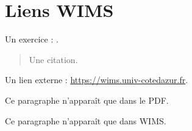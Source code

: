\documentclass[11pt]{article}
\theoremstyle{plain}
\theoremstyle{definition}
\begin{document}
\section{Liens WIMS}
\begin{center}
Un exercice : .
\end{center}
\begin{quote}
Une citation.
\end{quote}
Un lien externe : \url{https://wims.univ-cotedazur.fr}.
\begin{latexonly}
Ce paragraphe n'apparaît que dans le PDF.
\end{latexonly}
\begin{wimsonly}
Ce paragraphe n'apparaît que dans WIMS.
\end{wimsonly}
\end{document}
